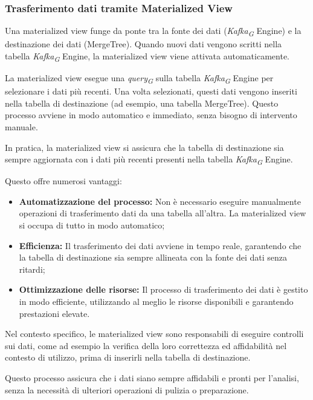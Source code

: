 \subsubsection{Trasferimento dati tramite Materialized View} \label{sec:materializedView}

Una materialized view funge da ponte tra la fonte dei dati (\textit{Kafka}\textsubscript{\textit{G}} Engine) e la destinazione dei dati (MergeTree). Quando nuovi dati vengono scritti nella tabella \textit{Kafka}\textsubscript{\textit{G}} Engine, la materialized view viene attivata automaticamente.

La materialized view esegue una \textit{query}\textsubscript{\textit{G}} sulla tabella \textit{Kafka}\textsubscript{\textit{G}} Engine per selezionare i dati più recenti. Una volta selezionati, questi dati vengono inseriti nella tabella di destinazione (ad esempio, una tabella MergeTree). Questo processo avviene in modo automatico e immediato, senza bisogno di intervento manuale.

In pratica, la materialized view si assicura che la tabella di destinazione sia sempre aggiornata con i dati più recenti presenti nella tabella \textit{Kafka}\textsubscript{\textit{G}} Engine.

Questo offre numerosi vantaggi:
\begin{itemize}
	\item \textbf{Automatizzazione del processo:} Non è necessario eseguire manualmente operazioni di trasferimento dati da una tabella all'altra. La materialized view si occupa di tutto in modo automatico;
	\item \textbf{Efficienza:} Il trasferimento dei dati avviene in tempo reale, garantendo che la tabella di destinazione sia sempre allineata con la fonte dei dati senza ritardi;
	\item \textbf{Ottimizzazione delle risorse:} Il processo di trasferimento dei dati è gestito in modo efficiente, utilizzando al meglio le risorse disponibili e garantendo prestazioni elevate.
\end{itemize}

Nel contesto specifico, le materialized view sono responsabili di eseguire controlli sui dati, come ad esempio la verifica della loro correttezza ed affidabilità nel contesto di utilizzo, prima di inserirli nella tabella di destinazione.

Questo processo assicura che i dati siano sempre affidabili e pronti per l'analisi, senza la necessità di ulteriori operazioni di pulizia o preparazione.

